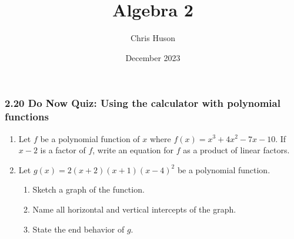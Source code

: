 \documentclass[12pt, twoside]{article}
\title{Algebra 2}
\author{Chris Huson}
\date{December 2023}
\begin{document}
\subsubsection*{2.20 Do Now Quiz: Using the calculator with polynomial functions}
\begin{enumerate}

\subsubsection*{A2-F.IF.7c Graph polynomials, identify zeros, end behavior}

\item Let $f$ be a polynomial function of $x$ where $f(x)=x^3+4x^2-7x-10$. If $x-2$ is a factor of $f$, write an equation for $f$ as a product of linear factors.
\vspace{5cm}

\item Let $g(x)=2(x+2)(x+1)(x-4)^2$ be a polynomial function. 
    \begin{center}
    \end{center}
    \begin{enumerate}[itemsep=0.25cm]
        \item Sketch a graph of the function.
        \item Name all horizontal and vertical intercepts of the graph.
        \item State the end behavior of $g$.
    \end{enumerate}

\end{enumerate}
\end{document}
